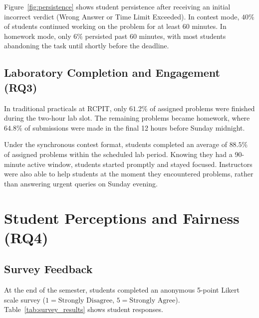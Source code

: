 \documentclass[12pt,a4paper]{article}
\begin{document}
Figure~\ref{fig:persistence} shows student persistence after receiving an initial incorrect verdict (Wrong Answer or Time Limit Exceeded). In contest mode, $40\%$ of students continued working on the problem for at least 60 minutes. In homework mode, only $6\%$ persisted past 60 minutes, with most students abandoning the task until shortly before the deadline.

\subsection{Laboratory Completion and Engagement (RQ3)}
In traditional practicals at RCPIT, only $61.2\%$ of assigned problems were finished during the two-hour lab slot. The remaining problems became homework, where $64.8\%$ of submissions were made in the final 12 hours before Sunday midnight.

Under the synchronous contest format, students completed an average of $88.5\%$ of assigned problems within the scheduled lab period. Knowing they had a 90-minute active window, students started promptly and stayed focused. Instructors were also able to help students at the moment they encountered problems, rather than answering urgent queries on Sunday evening.

\section{Student Perceptions and Fairness (RQ4)}
\label{sec:perceptions}

\subsection{Survey Feedback}
At the end of the semester, students completed an anonymous 5-point Likert scale survey ($1 = \text{Strongly Disagree}$, $5 = \text{Strongly Agree}$). Table~\ref{tab:survey_results} shows student responses.
\end{document}
